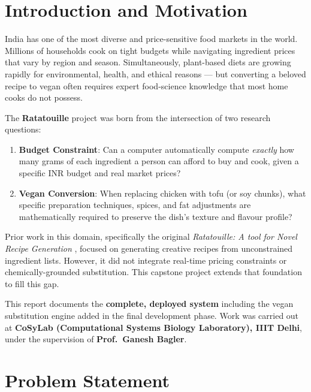 \documentclass[12pt, a4paper]{article}
\begin{document}
\section{Introduction and Motivation}

India has one of the most diverse and price-sensitive food markets in the world.  Millions of
households cook on tight budgets while navigating ingredient prices that vary by region and
season.  Simultaneously, plant-based diets are growing rapidly for environmental, health, and
ethical reasons --- but converting a beloved recipe to vegan often requires expert food-science
knowledge that most home cooks do not possess.

The \textbf{Ratatouille} project was born from the intersection of two research questions:

\begin{enumerate}
  \item \textbf{Budget Constraint}: Can a computer automatically compute \emph{exactly} how many grams of each ingredient a person can afford to buy and cook, given a specific INR budget and real market prices?
  \item \textbf{Vegan Conversion}: When replacing chicken with tofu (or soy chunks), what specific preparation techniques, spices, and fat adjustments are mathematically required to preserve the dish's texture and flavour profile?
\end{enumerate}

Prior work in this domain, specifically the original \textit{Ratatouille: A tool for Novel Recipe Generation} \cite{goel2022ratatouille}, focused on generating creative recipes from unconstrained
ingredient lists. However, it did not integrate real-time pricing constraints or chemically-grounded
substitution. This capstone project extends that foundation to fill this gap.

This report documents the \textbf{complete, deployed system} including the vegan substitution
engine added in the final development phase.  Work was carried out at
\textbf{CoSyLab (Computational Systems Biology Laboratory), IIIT Delhi}, under the supervision
of \textbf{Prof.\ Ganesh Bagler}.

\section{Problem Statement}
\end{document}
